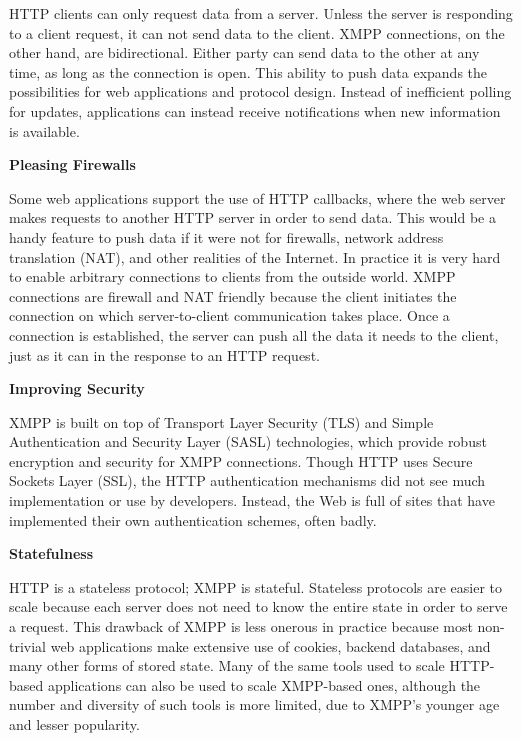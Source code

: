       HTTP clients can only request data from a server. Unless the server is responding to a client request,
      it can not send data to the client. XMPP connections, on the other hand, are bidirectional. Either party
      can send data to the other at any time, as long as the connection is open. This ability to push data expands the possibilities for web applications and protocol design. Instead of inefficient polling for updates, applications can instead receive notifications when new information is available.

      \textbf{Pleasing Firewalls}

      Some web applications support the use of HTTP callbacks, where the web server makes requests to another HTTP server in order to send data. This would be a handy feature to push data if it were not for firewalls, network address translation (NAT), and other realities of the Internet. In practice it is very hard to enable arbitrary connections to clients from the outside world. XMPP connections are firewall and NAT friendly because the client initiates the connection on which server-to-client communication takes place. Once a connection is established, the server can push all the data it needs to the client, just as it can in the response to an HTTP request.
      
      \textbf{Improving Security}

      XMPP is built on top of Transport Layer Security (TLS) and Simple Authentication and Security Layer (SASL) technologies, which provide robust encryption and security for XMPP connections. Though HTTP uses Secure Sockets Layer (SSL), the HTTP authentication mechanisms did not see much implementation or use by developers. Instead, the Web is full of sites that have implemented their own authentication schemes, often badly.
      
      \textbf{Statefulness}

      HTTP is a stateless protocol; XMPP is stateful. Stateless protocols are easier to scale because each server does not need to know the entire state in order to serve a request. This drawback of XMPP is less onerous in practice because most non-trivial web applications make extensive use of cookies, backend databases, and many other forms of stored state. Many of the same tools used to scale HTTP-based applications can also be used to scale XMPP-based ones, although the number and diversity of such tools is more limited, due to XMPP’s younger age and lesser popularity.

